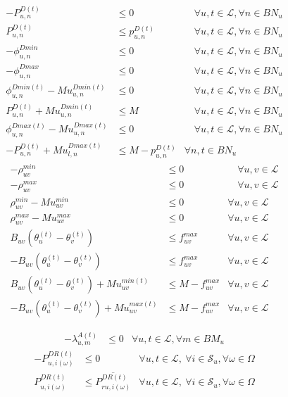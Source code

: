 \documentclass[a4j,10.5pt,fleqn]{jarticle}
\begin{document}
\begin{align}
-P_{u,n}^{D(t)}&\le 0&\quad \forall u,t\in\mathcal{L},\forall n\in BN_u \tag{n-1}\\
P_{u,n}^{D(t)}&\le p_{u,n}^{D(t)}&\quad \forall u,t\in\mathcal{L},\forall n\in BN_u \tag{n-2}\\
 -\phi_{u,n}^{Dmin}&\le 0&\quad \forall u,t\in\mathcal{L},\forall n\in BN_u  \tag{n-3}\\
 -\phi_{u,n}^{Dmax}&\le 0&\quad \forall u,t\in\mathcal{L},\forall n\in BN_u  \tag{n-4}\\
 \phi_{u,n}^{Dmin(t)} - Mu^{Dmin(t)}_{u,n} &\le0&\quad \forall u,t\in\mathcal{L},\forall n\in BN_u  \tag{n-5}\\
P_{u,n}^{D(t)}+Mu^{Dmin(t)}_{u,n} &\le M&\quad \forall u,t\in\mathcal{L},\forall n\in BN_u \tag{n-6}\\
\phi_{u,n}^{Dmax(t)}-Mu^{Dmax(t)}_{u,n}&\le0&\quad \forall u,t\in\mathcal{L},\forall n\in BN_u  \tag{n-7}\\
-P_{u,n}^{D(t)}+Mu^{Dmax(t)}_{l ,n}&\le M-p_{u,n}^{D(t)}&\forall n,t\in BN_u \tag{n-8}
\end{align}
\begin{align}
 -\rho_{uv}^{min}&\le 0&\quad \forall u,v\in\mathcal{L}\tag{rho-1}\\
 -\rho_{uv}^{max}&\le 0&\quad \forall u,v\in\mathcal{L}\tag{rho-2}\\
\rho_{uv}^{min}-Mu^{min}_{uv}&\le 0&\forall u,v \in \mathcal{L} \tag{rho-3}\\
\rho_{uv}^{max}-Mu^{max}_{uv}&\le 0&\forall u,v \in \mathcal{L} \tag{rho-4}\\
B_{uv}(\theta_u^{(t)}-\theta_v^{(t)})&\le f_{uv}^{max}&\forall u,v \in \mathcal{L}\tag{rho-5}\\
-B_{uv}(\theta_u^{(t)}-\theta_v^{(t)})&\le f_{uv}^{max}&\forall u,v \in \mathcal{L}\tag{rho-6}\\
B_{uv}(\theta_u^{(t)}-\theta_v^{(t)})+Mu^{min(t)}_{uv}&\le M-f_{uv}^{max}&\forall u,v \in \mathcal{L}\tag{rho-7}\\
-B_{uv}(\theta_u^{(t)}-\theta_v^{(t)}) +Mu^{max(t)}_{uv}&\le M-f_{uv}^{max}&\forall u,v \in \mathcal{L}\tag{rho-8}
\end{align}

\begin{align}
-\lambda_{u,m}^{A(t)}&\le0&\forall u,t\in\mathcal{L},\forall m\in BM_u \tag{lambdaA}
\end{align}
\begin{align}
-P_{u,i(\omega)}^{DR(t)} &\le 0 & \forall u,t\in\mathcal{L},\ \forall i\in\mathcal{S}_u, \forall \omega \in \Omega \tag{PDR-1}\\
P_{u,i(\omega)}^{DR(t)} &\le \overline{P_{ru,i(\omega)}^{DR(t)}}  & \forall u,t\in\mathcal{L},\ \forall i\in\mathcal{S}_u, \forall \omega \in \Omega \tag{PDR-2}
\end{align}
\end{document}
